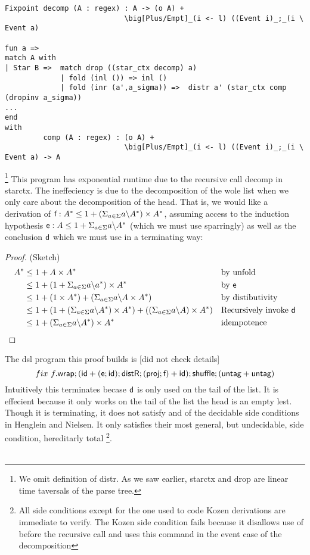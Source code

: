 \documentclass[a4paper,UKenglish,cleveref, autoref, thm-restate]{lipics-v2021}
\begin{document}
\begin{verbatim}
Fixpoint decomp (A : regex) : A -> (o A) +  
                            \big[Plus/Empt]_(i <- l) ((Event i)_;_(i \ Event a)

fun a =>
match A with 
| Star B =>  match drop ((star_ctx decomp) a)
             | fold (inl ()) => inl () 
             | fold (inr (a',a_sigma)) =>  distr a' (star_ctx comp (dropinv a_sigma))
...
end 
with
         comp (A : regex) : (o A) +  
                            \big[Plus/Empt]_(i <- l) ((Event i)_;_(i \ Event a) -> A
\end{verbatim}
\footnote{We omit definition of \textsf{distr}. As we saw earlier, \textsf{starctx} and \textsf{drop} are linear time taversals of the parse tree.}
This program has exponential runtime due to the recursive call \textsf{decomp} in \textsf{starctx}. The ineffeciency is due to the decomposition of the wole list when we only care about the decomposition of the head. That is, we would like a derivation of $\textsf{f} : A^* \leq 1 + (\Sigma_{a \in \Sigma} a \backslash A^*) \times A^*$, assuming access to the induction hypothesis $ \textsf{e} : A \leq 1 + \Sigma_{a \in \Sigma} a \backslash A^*$ (which we must use sparringly) as well as the conclusion $\textsf{d}$ which we must use in a terminating way:
\begin{proof} (Sketch)
\begin{align}
A^* &\leq  1 + A \times A^* && \text{by unfold}\\
 &\leq 1 + (1 + \Sigma_{a \in \Sigma} a \backslash a^*) \times A^* && \text{by } \textsf{e}\\
 &\leq 1 + (1 \times A^*) + (\Sigma_{a \in \Sigma} a \backslash A \times A^*) && \text{by distibutivity}\\
 &\leq 1 +  (1 + (\Sigma_{a \in \Sigma} a \backslash A^*) \times A^*) + ((\Sigma_{a \in \Sigma} a \backslash A) \times A^*) && \text{Recursively invoke  } \textsf{d}  \\
 &\leq 1 + (\Sigma_{a \in \Sigma} a \backslash A^*) \times A^* && \text{idempotence} 
\end{align}
\end{proof}
The dsl program this proof builds is [did not check details]
\[ \fix ~f.\dslcom{wrap};(\dslcom{id} + (\dslcom{e};\dslcom {id});\dslcom{distR};(\dslcom{proj};\dslcom{f})+\dslcom{id});\dslcom{shuffle};(\dslcom{untag} + \dslcom{untag}) \]
Intuitively this terminates becase $\textsf{d}$ is only used on the tail of the list. It is effecient because it only works on the tail of the list the head is an empty lest. Though it is terminating, it does not satisfy and of the decidable side conditions in Henglein and Nielsen. It only satisfies their most general, but undecidable, side condition, hereditarly total \footnote{All side conditions except for the one used to code Kozen derivations are immediate to verify. The Kozen side condition fails because it disallows use of  before the recursive call and  uses this command in the event case of the decomposition}.\\\\
\end{document}
